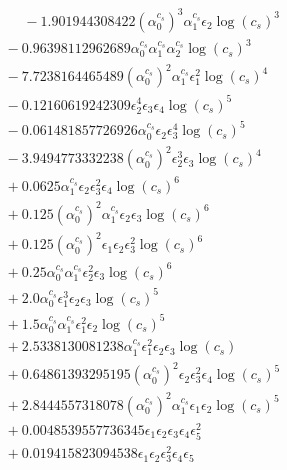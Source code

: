 \documentclass[10pt]{article}
\begin{document}
\begin{align*}
\phantom{F_{s,6}} &\phantom{={}}{}  - 1.901944308422 \left(\alpha_{0}^{c_s}\right)^{3} \alpha_{1}^{c_s} \epsilon_{2} \log{\left(c_{s} \right)}^{3} \\
&{}  - 0.96398112962689 \alpha_{0}^{c_s} \alpha_{1}^{c_s} \alpha_{2}^{c_s} \log{\left(c_{s} \right)}^{3} \\
&{}  - 7.7238164465489 \left(\alpha_{0}^{c_s}\right)^{2} \alpha_{1}^{c_s} \epsilon_{1}^{2} \log{\left(c_{s} \right)}^{4} \\
&{}  - 0.12160619242309 \epsilon_{2}^{4} \epsilon_{3} \epsilon_{4} \log{\left(c_{s} \right)}^{5} \\
&{}  - 0.061481857726926 \alpha_{0}^{c_s} \epsilon_{2} \epsilon_{3}^{4} \log{\left(c_{s} \right)}^{5} \\
&{}  - 3.9494773332238 \left(\alpha_{0}^{c_s}\right)^{2} \epsilon_{2}^{3} \epsilon_{3} \log{\left(c_{s} \right)}^{4} \\
&{}  + 0.0625 \alpha_{1}^{c_s} \epsilon_{2} \epsilon_{3}^{2} \epsilon_{4} \log{\left(c_{s} \right)}^{6} \\
&{}  + 0.125 \left(\alpha_{0}^{c_s}\right)^{2} \alpha_{1}^{c_s} \epsilon_{2} \epsilon_{3} \log{\left(c_{s} \right)}^{6} \\
&{}  + 0.125 \left(\alpha_{0}^{c_s}\right)^{2} \epsilon_{1} \epsilon_{2} \epsilon_{3}^{2} \log{\left(c_{s} \right)}^{6} \\
&{}  + 0.25 \alpha_{0}^{c_s} \alpha_{1}^{c_s} \epsilon_{2}^{2} \epsilon_{3} \log{\left(c_{s} \right)}^{6} \\
&{}  + 2.0 \alpha_{0}^{c_s} \epsilon_{1}^{3} \epsilon_{2} \epsilon_{3} \log{\left(c_{s} \right)}^{5} \\
&{}  + 1.5 \alpha_{0}^{c_s} \alpha_{1}^{c_s} \epsilon_{1}^{2} \epsilon_{2} \log{\left(c_{s} \right)}^{5} \\
&{}  + 2.5338130081238 \alpha_{1}^{c_s} \epsilon_{1}^{2} \epsilon_{2} \epsilon_{3} \log{\left(c_{s} \right)} \\
&{}  + 0.64861393295195 \left(\alpha_{0}^{c_s}\right)^{2} \epsilon_{2} \epsilon_{3}^{2} \epsilon_{4} \log{\left(c_{s} \right)}^{5} \\
&{}  + 2.8444557318078 \left(\alpha_{0}^{c_s}\right)^{2} \alpha_{1}^{c_s} \epsilon_{1} \epsilon_{2} \log{\left(c_{s} \right)}^{5} \\
&{}  + 0.0048539557736345 \epsilon_{1} \epsilon_{2} \epsilon_{3} \epsilon_{4} \epsilon_{5}^{2} \\
&{}  + 0.019415823094538 \epsilon_{1} \epsilon_{2} \epsilon_{3}^{2} \epsilon_{4} \epsilon_{5} \\

\end{align*}
\end{document}
